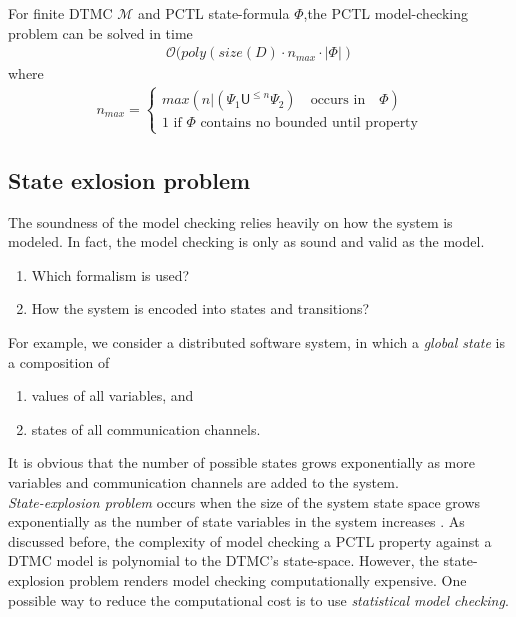 \begin{theorem}
    For finite DTMC $\mathcal{M}$ and PCTL state-formula $\Phi$,the PCTL model-checking problem can be solved in time
    \begin{align*}
        \mathcal{O}(poly(size(D)\cdot n_{max} \cdot |\Phi|)
    \end{align*}
    where
    \begin{align*}
        n_{max} =
        \begin{cases}
            max(n | (\Psi_1 \mathsf{U}^{\leq n} \Psi_2) \quad\text{occurs in}\quad \Phi) \\
            1 \text{ if $\Phi$ contains no bounded until property}
        \end{cases}
    \end{align*}
\end{theorem}

\subsection{State exlosion problem}
The soundness of the model checking relies heavily on how the system is modeled. In fact, the model
checking is only as sound and valid as the model.
\begin{enumerate}
    \item Which formalism is used?
    \item How the system is encoded into states and transitions?
\end{enumerate}
For example, we consider a distributed software system, in which a \textit{global state} is a
composition of
\begin{enumerate}
    \item values of all variables, and
    \item states of all communication channels.
\end{enumerate}
It is obvious that the number of possible states grows exponentially as more variables and
communication channels are added to the system.\\
\textit{State-explosion problem} occurs when the size of the system state space grows exponentially
as the number of state variables in the system increases \cite{clarke2011model}. As discussed
before, the complexity of model checking a PCTL property against a DTMC model is polynomial to the
DTMC's state-space. However, the state-explosion problem renders model checking computationally
expensive. One possible way to reduce the computational cost is to use \textit{statistical model
    checking}.


